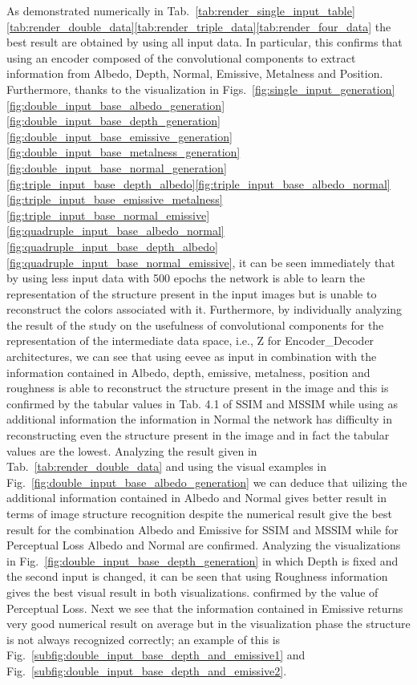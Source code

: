 As demonstrated numerically in Tab.~\ref{tab:render_single_input_table}\ref{tab:render_double_data}\ref{tab:render_triple_data}\ref{tab:render_four_data} the best result are obtained by using all input data. In particular, this confirms that using an encoder composed of the convolutional components to extract information from Albedo, Depth, Normal, Emissive, Metalness and Position. 
Furthermore, thanks to the visualization in Figs.~\ref{fig:single_input_generation}\ref{fig:double_input_base_albedo_generation}\ref{fig:double_input_base_depth_generation}\ref{fig:double_input_base_emissive_generation}\ref{fig:double_input_base_metalness_generation}\ref{fig:double_input_base_normal_generation}\ref{fig:triple_input_base_depth_albedo}\ref{fig:triple_input_base_albedo_normal}\ref{fig:triple_input_base_emissive_metalness}\ref{fig:triple_input_base_normal_emissive}\ref{fig:quadruple_input_base_albedo_normal}\ref{fig:quadruple_input_base_depth_albedo}\ref{fig:quadruple_input_base_normal_emissive}, it can be seen immediately that by using less input data with 500 epochs the network is able to learn the representation of the structure present in the input images but is unable to reconstruct the colors associated with it. Furthermore, by individually analyzing the result of the study on the usefulness of convolutional components for the representation of the intermediate data space, i.e., Z for Encoder_Decoder architectures, we can see that using eevee as input in combination with the information contained in Albedo, depth, emissive, metalness, position and roughness is able to reconstruct the structure present in the image and this is confirmed by the tabular values in Tab. 4.1 of SSIM and MSSIM while using as additional information the information in Normal the network has difficulty in reconstructing even the structure present in the image and in fact the tabular values are the lowest. 
Analyzing the result given in Tab.~\ref{tab:render_double_data} and using the visual examples in Fig.~\ref{fig:double_input_base_albedo_generation} we can deduce that uilizing the additional information contained in Albedo and Normal gives better result in terms of image structure recognition despite the numerical result give the best result for the combination Albedo and Emissive for SSIM and MSSIM while for Perceptual Loss Albedo and Normal are confirmed. Analyzing the visualizations in Fig.~\ref{fig:double_input_base_depth_generation} in which Depth is fixed and the second input is changed, it can be seen that using Roughness information gives the best visual result in both visualizations. confirmed by the value of Perceptual Loss. Next we see that the information contained in Emissive returns very good numerical result on average but in the visualization phase the structure is not always recognized correctly; an example of this is Fig.~\ref{subfig:double_input_base_depth_and_emissive1} and Fig.~\ref{subfig:double_input_base_depth_and_emissive2}.

